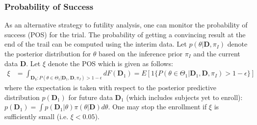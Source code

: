 \documentclass[12pt]{article}
\begin{document}
\subsubsection*{Probability of Success}
As an alternative strategy to futility analysis, one can monitor the probability of success (POS) for the trial. The probability of getting a convincing result at the end of the trail can be computed using the interim data. Let $p(\theta|\mathbf{D}, \pi_{I})$ denote the posterior distribution for $\theta$ based on the inference prior $ \pi_{I}$ and the current data $\mathbf{D}$. Let $\xi$ denote the POS which is given as follows:
\begin{align}
\xi&=\int_{\mathbf{D_1}:P(\theta\in\Theta_1|\mathbf{D}_1,\mathbf{D}, \pi_{I})>1-\epsilon}dF(\mathbf{D}_1)=E[1\{P(\theta\in\Theta_1|\mathbf{D}_1,\mathbf{D}, \pi_{I})>1-\epsilon\}]
\end{align}
where the expectation is taken with respect to the posterior predictive distribution $p(\mathbf{D}_1)$ for future data $\mathbf{D}_1$ (which includes subjects yet to enroll): $p(\mathbf{D}_1)=\int p(\mathbf{D}_1|\theta) \pi(\theta|\mathbf{D})d\theta$.
One may stop the enrollment if $\xi$ is sufficiently small (i.e. $\xi<0.05$).

%
\end{document}
